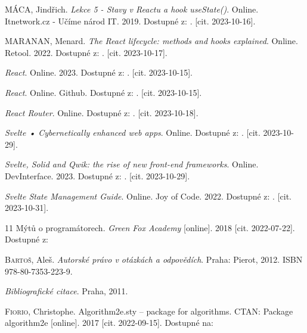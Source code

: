 \begin{thebibliography}{99}
\textsc{MÁCA}, Jindřich. \emph{Lekce 5 - Stavy v Reactu a hook useState()}. Online. Itnetwork.cz - Učíme národ IT. 2019. Dostupné z: . [cit. 2023-10-16].

\textsc{MARANAN}, Menard. \emph{The React lifecycle: methods and hooks explained}. Online. Retool. 2022. Dostupné z: . [cit. 2023-10-17].

\emph{React}. Online. 2023. Dostupné z: . [cit. 2023-10-15].

\emph{React}. Online. Github. Dostupné z: . [cit. 2023-10-15].

\emph{React Router}. Online. Dostupné z: . [cit. 2023-10-18].

\emph{Svelte • Cybernetically enhanced web apps}. Online. Dostupné z: . [cit. 2023-10-29].

\emph{Svelte, Solid and Qwik: the rise of new front-end frameworks}. Online. DevInterface. 2023. Dostupné z: . [cit. 2023-10-29].

\emph{Svelte State Management Guide}. Online. Joy of Code. 2022. Dostupné z: . [cit. 2023-10-31].



11 Mýtů o programátorech. \emph{Green Fox Academy} [online]. 2018 [cit. 2022-07-22]. Dostupné z: 

\textsc{Bartoš}, Aleš. \emph{Autorské právo v otázkách a odpovědích}. Praha: Pierot, 2012. ISBN 978-80-7353-223-9.

\emph{Bibliografické citace}. Praha, 2011.

\textsc{Fiorio}, Christophe. Algorithm2e.sty -- package for algorithms. CTAN: Package algorithm2e [online]. 2017 [cit. 2022-09-15]. Dostupné na: 


\end{thebibliography}
